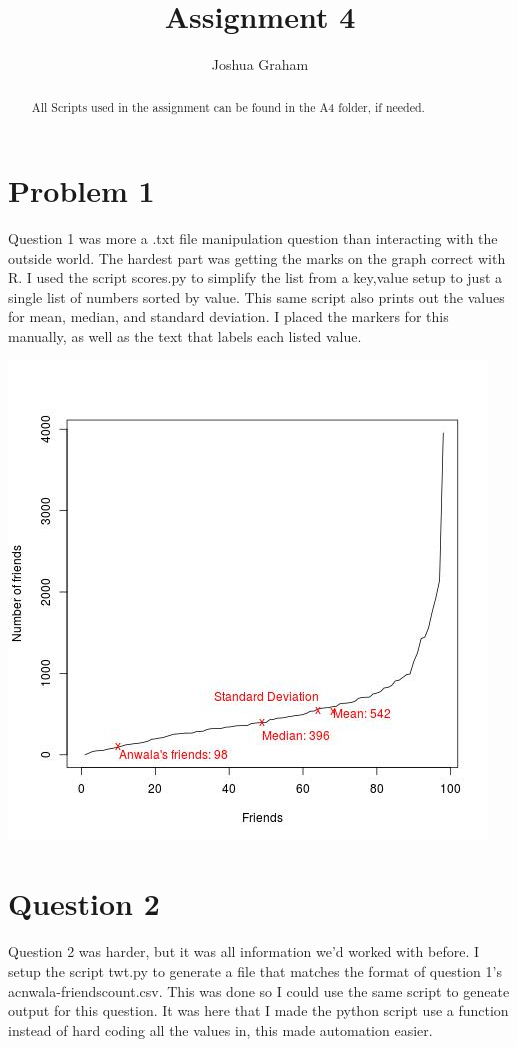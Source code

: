 \documentclass[11pt]{report}
\begin{document}
\title{Assignment 4}
\author{Joshua Graham}

\maketitle
\pagebreak
\begin{abstract}
All Scripts used in the assignment can be found in the A4 folder, if needed.

\end{abstract}
\section{Problem 1}
	Question 1 was more a .txt file manipulation question than interacting with the outside world. The hardest part was getting the marks on the graph correct with R. I used the script scores.py to simplify the list from a key,value setup to just a single list of numbers sorted by value. This same script also prints out the values for mean, median, and standard deviation. I placed the markers for this manually, as well as the text that labels each listed value.
	
\includegraphics[scale=1]{A1.jpeg}
\pagebreak
\section{Question 2}
	Question 2 was harder, but it was all information we'd worked with before. I setup the script twt.py to generate a file that matches the format of question 1's acnwala-friendscount.csv. This was done so I could use the same script to geneate output for this question. It was here that I made the python script use a function instead of hard coding all the values in, this made automation easier. 
	
\end{document}
